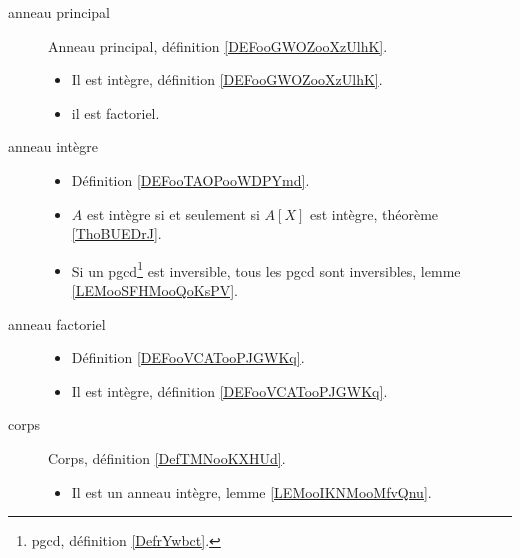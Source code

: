 \begin{description}
	\item[anneau principal]
		Anneau principal, définition \ref{DEFooGWOZooXzUlhK}.
		\begin{itemize}
			\item
			      Il est intègre, définition \ref{DEFooGWOZooXzUlhK}.
			\item
			      il est factoriel\cite{BIBooENJGooWhQisg}.		%
		\end{itemize}
		\item[anneau intègre]\hspace{1cm}
		\begin{itemize}
			\item
			      Définition \ref{DEFooTAOPooWDPYmd}.
			\item
			      \( A\) est intègre si et seulement si \( A[X]\) est intègre, théorème \ref{ThoBUEDrJ}.
			\item
			      Si un pgcd\footnote{pgcd, définition \ref{DefrYwbct}.} est inversible, tous les pgcd sont inversibles, lemme \ref{LEMooSFHMooQoKsPV}.
		\end{itemize}
	\item[anneau factoriel]
		\begin{itemize}
			\item
			      Définition \ref{DEFooVCATooPJGWKq}.
			\item
			      Il est intègre, définition \ref{DEFooVCATooPJGWKq}.
		\end{itemize}
	\item[corps]
		Corps, définition \ref{DefTMNooKXHUd}.
		\begin{itemize}
			\item
			      Il est un anneau intègre, lemme \ref{LEMooIKNMooMfvQnu}.
		\end{itemize}
\end{description}

